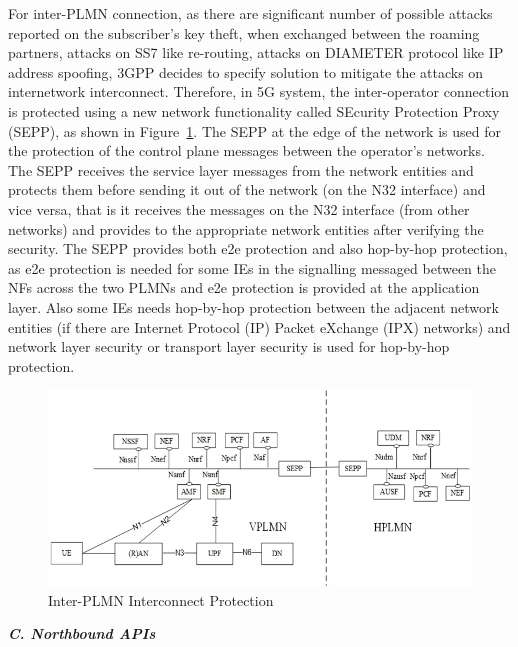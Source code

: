 \begin{multicols}{2}
For inter-PLMN connection, as there are significant number of possible attacks reported on the subscriber’s key theft, when exchanged between the roaming partners, attacks on SS7 like re-routing, attacks on DIAMETER protocol like IP address spoofing, 3GPP decides to specify solution to mitigate the attacks on internetwork interconnect. Therefore, in 5G system, the inter-operator connection is protected using a new network functionality called SEcurity Protection Proxy (SEPP), as shown in Figure~\ref{chap4-fig08}. The SEPP at the edge of the network is used for the protection of the control plane messages between the operator’s networks. The SEPP receives the service layer messages from the network entities and protects them before sending it out of the network (on the N32 interface) and vice versa, that is it receives the messages on the N32 interface (from other networks) and provides to the appropriate network entities after verifying the security.  The SEPP provides both e2e protection and also hop-by-hop protection, as e2e protection is needed for some IEs in the signalling messaged between the NFs across the two PLMNs and e2e protection is provided at the application layer. Also some IEs needs hop-by-hop protection between the adjacent network entities (if there are Internet Protocol (IP) Packet eXchange (IPX) networks) and network layer security or transport layer security is used for hop-by-hop protection.
\begin{figure}[H]
\centering
\includegraphics[scale=1.35]{src/Figures/chap4/chap4-fig08.jpg}
\caption{Inter-PLMN Interconnect Protection}\label{chap4-fig08}
\end{figure}

\noindent
{\bf {\textit{C. Northbound APIs}}}


\end{multicols}
